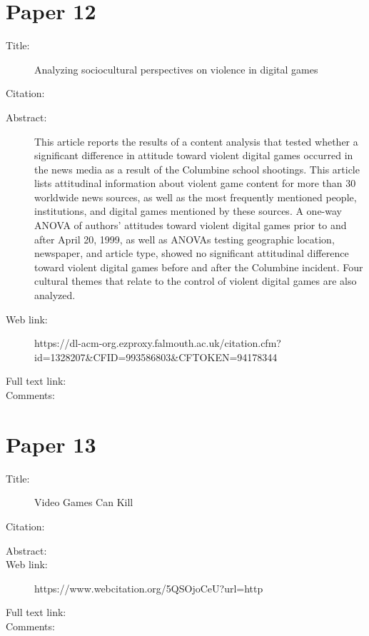 \documentclass{scrartcl}
\begin{document}
\section*{Paper 12}
\begin{description}
\item[Title:] Analyzing sociocultural perspectives on violence in digital games
\item[Citation:] \cite{}
\item[Abstract:] This article reports the results of a content analysis that tested whether a significant difference in attitude toward violent digital games occurred in the news media as a result of the Columbine school shootings. This article lists attitudinal information about violent game content for more than 30 worldwide news sources, as well as the most frequently mentioned people, institutions, and digital games mentioned by these sources. A one-way ANOVA of authors' attitudes toward violent digital games prior to and after April 20, 1999, as well as ANOVAs testing geographic location, newspaper, and article type, showed no significant attitudinal difference toward violent digital games before and after the Columbine incident. Four cultural themes that relate to the control of violent digital games are also analyzed.
\item[Web link:] https://dl-acm-org.ezproxy.falmouth.ac.uk/citation.cfm?id=1328207&CFID=993586803&CFTOKEN=94178344
\item[Full text link:] 
\item[Comments:]   
\end{description}


\section*{Paper 13}
\begin{description}
\item[Title:] Video Games Can Kill 
\item[Citation:] \cite{}
\item[Abstract:] 
\item[Web link:] https://www.webcitation.org/5QSOjoCeU?url=http%
\item[Full text link:] 
\item[Comments:]   
\end{description}




\end{document}

